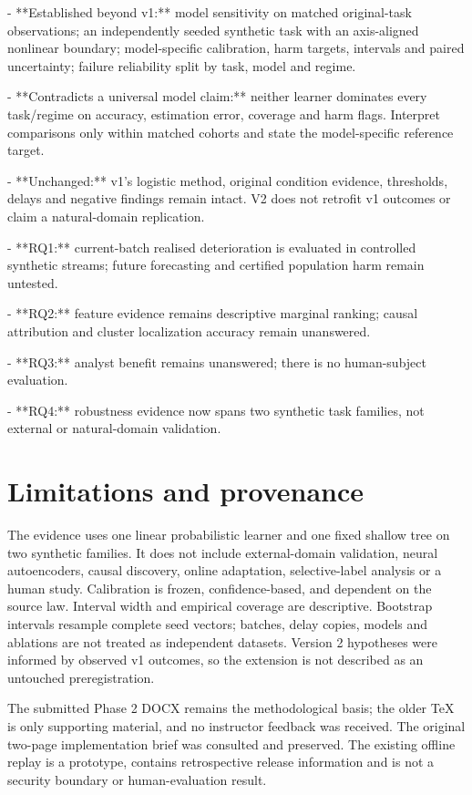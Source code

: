 \documentclass[11pt,a4paper]{article}
\begin{document}
- **Established beyond v1:** model sensitivity on matched original-task observations; an independently seeded synthetic task with an axis-aligned nonlinear boundary; model-specific calibration, harm targets, intervals and paired uncertainty; failure reliability split by task, model and regime.\par
- **Contradicts a universal model claim:** neither learner dominates every task/regime on accuracy, estimation error, coverage and harm flags. Interpret comparisons only within matched cohorts and state the model-specific reference target.\par
- **Unchanged:** v1’s logistic method, original condition evidence, thresholds, delays and negative findings remain intact. V2 does not retrofit v1 outcomes or claim a natural-domain replication.\par
- **RQ1:** current-batch realised deterioration is evaluated in controlled synthetic streams; future forecasting and certified population harm remain untested.\par
- **RQ2:** feature evidence remains descriptive marginal ranking; causal attribution and cluster localization accuracy remain unanswered.\par
- **RQ3:** analyst benefit remains unanswered; there is no human-subject evaluation.\par
- **RQ4:** robustness evidence now spans two synthetic task families, not external or natural-domain validation.\par

\section{Limitations and provenance}

The evidence uses one linear probabilistic learner and one fixed shallow tree on two synthetic families. It does not include external-domain validation, neural autoencoders, causal discovery, online adaptation, selective-label analysis or a human study. Calibration is frozen, confidence-based, and dependent on the source law. Interval width and empirical coverage are descriptive. Bootstrap intervals resample complete seed vectors; batches, delay copies, models and ablations are not treated as independent datasets. Version 2 hypotheses were informed by observed v1 outcomes, so the extension is not described as an untouched preregistration.\par

The submitted Phase 2 DOCX remains the methodological basis; the older TeX is only supporting material, and no instructor feedback was received. The original two-page implementation brief was consulted and preserved. The existing offline replay is a prototype, contains retrospective release information and is not a security boundary or human-evaluation result.\par
\end{document}
